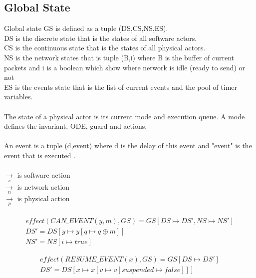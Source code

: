 \documentclass[]{article}
\begin{document}
\subsection{Global State}
Global state GS is defined as a tuple (DS,CS,NS,ES). \\
DS is the discrete state that is the states of all software actors. \\
CS is the continuous state that is the states of all physical actors.  \\
NS is the network states that is tuple (B,i) where B is the buffer of current packets and i is a boolean which show where network is idle (ready to send) or not \\
ES is the events state that is the list of current events and the pool of timer variables. \\
\\
The state of a physical actor is its current mode and execution queue. A mode defines the invariant, ODE, guard and actions. \\
\\
An event is a tuple (d,event) where d is the delay of this event and "event" is the event that is executed . \\
\\
$\xrightarrow[s]{}$ is software action \\
$\xrightarrow[n]{}$ is network action \\
$\xrightarrow[p]{}$ is physical action \\
\\

\begin{equation}
\begin{gathered}
effect(CAN\_EVENT(y,m), GS) = GS[DS\longmapsto DS',NS\longmapsto NS'] \\
  DS'= DS[y\longmapsto y[q\longmapsto q \oplus m]] \\
  NS' = NS[i\longmapsto true]
\end{gathered}
\end{equation}

\begin{equation}
\begin{gathered}
effect(RESUME\_EVENT(x), GS) = GS[DS\longmapsto DS'] \\
DS'= DS[x\longmapsto x[v\longmapsto v[suspended \longmapsto false]]] \\
\end{gathered}
\end{equation}
\end{document}
